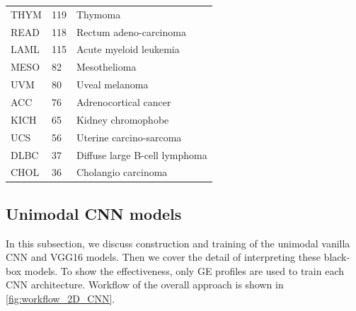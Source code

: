 \begin{table} [!ht]
\begin{center}
\begin{tabular}{l|l|l}
         THYM & 119  & Thymoma	 \\%
         READ & 118  & Rectum adeno-carcinoma \\%
         LAML & 115  & Acute myeloid leukemia	\\%
         MESO & 82  & Mesothelioma	\\%
         UVM & 80  & Uveal melanoma	 \\%
         ACC & 76  & Adrenocortical cancer	\\%
         KICH & 65  & Kidney chromophobe	\\%
         UCS & 56  & Uterine carcino-sarcoma	 \\%
         DLBC & 37  & Diffuse large B-cell lymphoma	\\%
         CHOL & 36  & Cholangio carcinoma	 \\%
         \bottomrule
    \end{tabular}
    \end{center}
\end{table}
\fi 

\subsection{Unimodal CNN models}
In this subsection, we discuss construction and training of the unimodal vanilla CNN and VGG16 models. Then we cover the detail of interpreting these black-box models. To show the effectiveness, only GE profiles are used to train each CNN architecture. Workflow of the overall approach is shown in \cref{fig:workflow_2D_CNN}.

